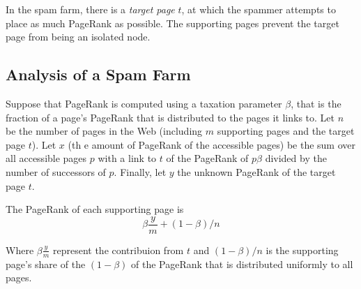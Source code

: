 In the spam farm, there is a \textit{target page} $t$, at which the spammer attempts to place as much PageRank as possible. The supporting pages prevent the target page from being an isolated node.

\subsection{Analysis of a Spam Farm}\label{subsec:analysis-spam-farm}

Suppose that PageRank is computed using a taxation parameter $\beta$, that is the fraction of a page's PageRank that is distributed to the pages it links to. Let $n$ be the number of pages in the Web (including $m$ supporting pages and the target page $t$). Let $x$ (th e amount of PageRank of the accessible pages) be the sum over all accessible pages $p$ with a link to $t$ of the PageRank of $p \beta$ divided by the number of successors of $p$. Finally, let $y$ the unknown PageRank of the target page $t$.

The PageRank of each supporting page is
\begin{equation*}
    \beta \frac{y}{m} + (1 - \beta) / n
\end{equation*}

Where $\beta \frac{y}{m}$  represent the contribuion from $t$ and $(1 - \beta) / n$ is the supporting page's share of the $(1 - \beta)$ of the PageRank that is distributed uniformly to all pages.



